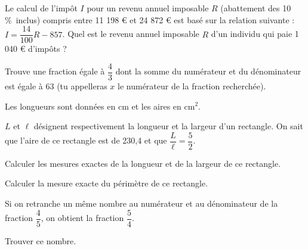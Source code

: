 



\begin{exercice}
Le calcul de l'impôt $I$ pour un revenu annuel imposable $R$ (abattement des 10\,\%\ inclus) compris entre 11 198 € et 24 872 € est basé sur la relation suivante : $I =\dfrac{14}{100}R - 857$. 
Quel est le revenu annuel imposable $R$ d'un individu qui paie 1 040 € d'impôts ?
\end{exercice}



\begin{exercice}

Trouve une fraction égale à $\dfrac{4}{3}$ dont la somme du numérateur et du dénominateur est égale à 63 (tu appelleras $x$ le numérateur de la fraction recherchée). 
\end{exercice}



\begin{exercice}[Un rectangle...]

Les longueurs sont données en cm et les aires en cm$^2$.

$L$ et $\ell$ désignent respectivement la longueur et la largeur d'un rectangle. On sait que l'aire de ce rectangle est de 230,4 et que $\dfrac{L}{\ell}=\dfrac{5}{2}$.

\begin{colenumerate}{1} 
\item Calculer les mesures exactes de la longueur et de la largeur de ce rectangle.
\item Calculer la mesure exacte du périmètre de ce rectangle.
\end{colenumerate} 
\end{exercice}



\begin{exercice}
Si on retranche un même nombre au numérateur et au dénominateur de la fraction $\dfrac{4}{5}$, on obtient la fraction $\dfrac{5}{4}$.

Trouver ce nombre.
\end{exercice}

